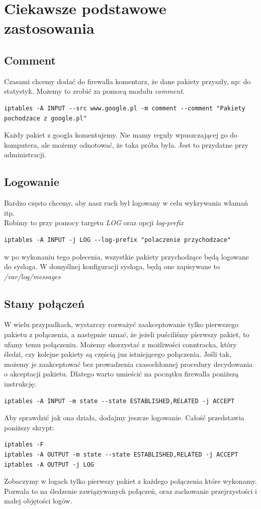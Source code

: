 \documentclass[a4paper,11pt]{article}
\begin{document}
\section{Ciekawsze podstawowe zastosowania}
\subsection{Comment}
Czasami chcemy dodać do firewalla komentarz, że dane pakiety przyszły, np: do statystyk. Możemy to zrobić za pomocą modułu \textit{comment}.
\begin{verbatim}
iptables -A INPUT --src www.google.pl -m comment --comment "Pakiety pochodzace z google.pl"
\end{verbatim}
Każdy pakiet z googla komentujemy. Nie mamy reguły wpuszczającej go do komputera, ale możemy odnotować, że taka próba była. Jest to przydatne przy administracji.
\subsection{Logowanie}
Bardzo często chcemy, aby nasz ruch był logowany w celu wykrywania włamań itp.\\
Robimy to przy pomocy targetu \textit{LOG} oraz opcji \textit{log-prefix}
\begin{verbatim}
iptables -A INPUT -j LOG --log-prefix "polaczenie przychodzace"
\end{verbatim}
w po wykonaniu tego polecenia, wszystkie pakiety przychodzące będą logowane do sysloga. W domyślnej konfiguracji sysloga, będą one zapisywane to \textit{/var/log/messages}
\subsection{Stany połączeń}
W wielu przypadkach, wystarczy rozważyć zaakceptowanie tylko pierwszego pakietu z połączenia, a następnie uznać, że jeżeli puściliśmy pierwszy pakiet, to ufamy temu połączeniu. Możemy skorzystać z możliwości conntracka, który śledzi, czy kolejne pakiety są częścią juz istniejącego połączenia. Jeśli tak, możemy je zaakceptować bez prowadzenia czasochłonnej procedury decydowania o akceptacji pakietu.
Dlatego warto umieścić na początku firewalla poniższą instrukcję:
\begin{verbatim}
iptables -A INPUT -m state --state ESTABLISHED,RELATED -j ACCEPT
\end{verbatim}
Aby sprawdzić jak ona działa, dodajmy jeszcze logowanie. Całość przedstawia poniższy skrypt:
\begin{verbatim}
iptables -F
iptables -A OUTPUT -m state --state ESTABLISHED,RELATED -j ACCEPT
iptables -A OUTPUT -j LOG
\end{verbatim}
Zobaczymy w logach tylko pierwszy pakiet z każdego połączenia które wykonamy. Pozwala to na śledzenie zawiązywanych połączeń, oraz zachowanie przejrzystości i małej objętości logów.
\end{document}
